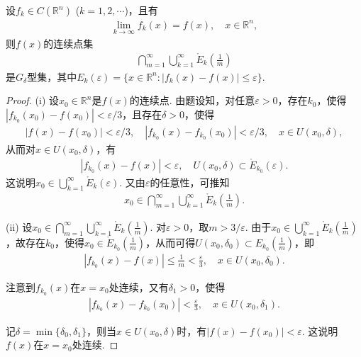 \documentclass[../../main.tex]{subfiles}
\begin{document}
\begin{example}\label{example:例12}
设$f_k\in C(\mathbb{R}^n)$ ($k = 1,2,\cdots$)，且有
\begin{align*}
\lim_{k\to\infty}f_k(x)=f(x), \quad x\in\mathbb{R}^n,
\end{align*}
则$f(x)$的连续点集
\begin{align*}
\bigcap_{m = 1}^{\infty}\bigcup_{k = 1}^{\infty}\mathring{E}_k\left(\frac{1}{m}\right)
\end{align*}
是$G_{\delta}$型集，其中$E_k(\varepsilon)=\{x\in\mathbb{R}^n: |f_k(x)-f(x)|\leqslant\varepsilon\}$.
\end{example}
\begin{proof}
(i) 设$x_0\in\mathbb{R}^n$是$f(x)$的连续点. 由题设知，对任意$\varepsilon>0$，存在$k_0$，使得$|f_{k_0}(x_0)-f(x_0)|<\varepsilon/3$，且存在$\delta>0$，使得
\begin{align*}
|f(x)-f(x_0)|<\varepsilon/3, \quad |f_{k_0}(x)-f_{k_0}(x_0)|<\varepsilon/3, \quad x\in U(x_0,\delta),
\end{align*}
从而对$x\in U(x_0,\delta)$，有
\begin{align*}
|f_{k_0}(x)-f(x)|<\varepsilon, \quad U(x_0,\delta)\subset\mathring{E}_{k_0}(\varepsilon).
\end{align*}
这说明$x_0\in\bigcup_{k = 1}^{\infty}\mathring{E}_k(\varepsilon)$. 又由$\varepsilon$的任意性，可推知
\begin{align*}
x_0\in\bigcap_{m = 1}^{\infty}\bigcup_{k = 1}^{\infty}\mathring{E}_k\left(\frac{1}{m}\right).
\end{align*}

(ii) 设$x_0\in\bigcap_{m = 1}^{\infty}\bigcup_{k = 1}^{\infty}\mathring{E}_k\left(\frac{1}{m}\right)$. 对$\varepsilon>0$，取$m>3/\varepsilon$. 由于$x_0\in\bigcup_{k = 1}^{\infty}\mathring{E}_k\left(\frac{1}{m}\right)$，故存在$k_0$，使得$x_0\in\mathring{E}_{k_0}\left(\frac{1}{m}\right)$，从而可得$U(x_0,\delta_0)\subset E_{k_0}\left(\frac{1}{m}\right)$，即
\begin{align*}
|f_{k_0}(x)-f(x)|\leqslant\frac{1}{m}<\frac{\varepsilon}{3}, \quad x\in U(x_0,\delta_0).
\end{align*}

注意到$f_{k_0}(x)$在$x = x_0$处连续，又有$\delta_1>0$，使得
\begin{align*}
|f_{k_0}(x)-f_{k_0}(x_0)|<\frac{\varepsilon}{3}, \quad x\in U(x_0,\delta_1).
\end{align*}

记$\delta=\min\{\delta_0,\delta_1\}$，则当$x\in U(x_0,\delta)$时，有$|f(x)-f(x_0)|<\varepsilon$. 这说明$f(x)$在$x = x_0$处连续. 

\end{proof}
\end{document}
